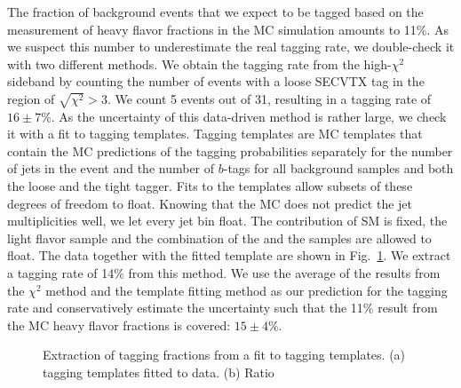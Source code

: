 The fraction of background events that we expect to be tagged based on
the measurement of heavy flavor fractions in the MC simulation amounts
to 11\%. As we suspect this number to underestimate the real tagging
rate, we double-check it with two different methods. We obtain the
tagging rate from the high-$\chi^2$ sideband by counting the
number of events with a loose SECVTX tag in the region of
$\sqrt{\chi^2}>3$. We count 5 events out of 31, resulting in a tagging
rate of $16\pm7\%$.  As the uncertainty of this data-driven method
is rather large, we check it with a fit to tagging templates.  Tagging
templates are MC templates that contain the MC predictions of the
tagging probabilities separately for the number of jets in the event
and the number of $b$-tags for all background samples and both the
loose and the tight tagger.  Fits to the templates allow subsets of
these degrees of freedom to float. Knowing that the MC does not
predict the jet multiplicities well, we let every jet bin float. The
contribution of SM \ttbar is fixed, the light flavor \Zj sample and
the combination of the \Zcc and the \Zbb samples are allowed to float.
The data together with the fitted template are shown in
Fig.~\ref{fig:tagtemp}. We extract a tagging rate of 14\% from 
this method. We use the average of the results from the $\chi^2$ method
and the template fitting method as our prediction for the 
tagging rate and conservatively estimate the uncertainty such that the
11\% result from the MC heavy flavor fractions is covered:
$15 \pm 4\%$.


\begin{figure}[t]
  \begin{center}
  \end{center}
  \caption{Extraction of tagging fractions from a fit to tagging templates. (a) tagging templates fitted to data. (b) Ratio }
  \label{fig:tagtemp}
\end{figure}



